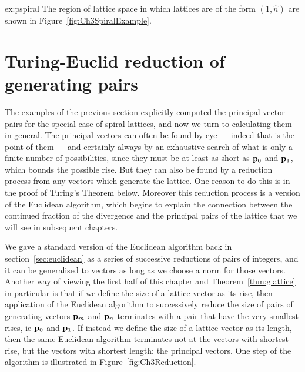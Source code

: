 \begin{jAnswer}{ex:pspiral}
The region of lattice space in which lattices are of the form $(1,\hat{n})$ are shown in Figure~\ref{fig:Ch3SpiralExample}.

\end{jAnswer}
 
\clearpage
\section{Turing-Euclid reduction of generating pairs}
\label{sec:TEreduction}
The examples of the previous section explicitly computed the principal vector pairs for the special case of spiral lattices, and now we turn to calculating them in 
general. 
The principal vectors can often be found by eye --- indeed that is the point of them --- and certainly always by an exhaustive search of what is only a finite number of possibilities, since they must be at least as short as ${\mathbf p}_{0}$ and ${\mathbf p}_{1}$, which bounds the possible rise.
But they can also be found by a reduction process from any vectors which generate the lattice. One reason to do this is in the proof of Turing's Theorem below. Moreover this reduction process is a version of the Euclidean algorithm, which begins to explain the connection between the continued fraction of the divergence and the principal pairs of the lattice that we will see in subsequent chapters. 

We gave a standard version of the Euclidean algorithm back in section~\eqref{sec:euclidean} as a series of successive reductions of pairs of integers, and it can be generalised to vectors as long as we choose a norm for those vectors. Another way of viewing the first half of this chapter and Theorem~\ref{thm:glattice} in particular is that 
if we define the size of a lattice vector as its rise, then application of the Euclidean algorithm to successively reduce the size of pairs of generating  vectors ${\mathbf p}_{m}$ and ${\mathbf p}_{n}$  terminates with a pair that have the very smallest rises, ie ${\mathbf p}_{0}$ and ${\mathbf p}_{1}$. If instead we define the size of a lattice vector as its length, then the same Euclidean algorithm terminates not at the vectors with shortest rise, but the vectors with shortest length: the principal vectors. One step of the algorithm is illustrated in Figure~\ref{fig:Ch3Reduction}.


